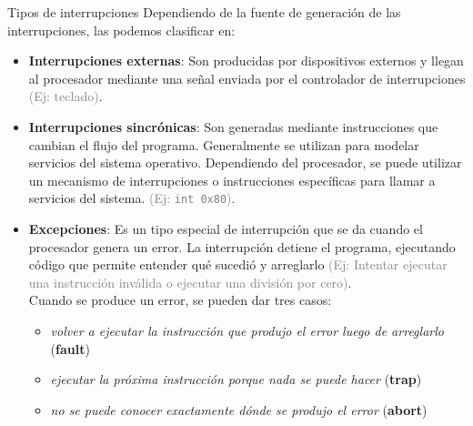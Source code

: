 \documentclass[aspectratio=169]{beamer}
\begin{document}
\begin{frame}[fragile]{Tipos de interrupciones}
    Dependiendo de la fuente de generación de las interrupciones, las podemos clasificar en:
    \bigskip
    \begin{itemize}
    \setlength\itemsep{0.5cm}
    \item<2-> \normalsize \textbf{Interrupciones externas}:
    \small Son producidas por dispositivos externos y llegan al procesador mediante una señal enviada por el controlador de interrupciones \textcolor{gray}{(Ej: teclado)}.
    \item<3-> \normalsize \textbf{Interrupciones sincrónicas}:
    \small Son generadas mediante instrucciones que cambian el flujo del programa. Generalmente se utilizan para modelar servicios del sistema operativo.
    Dependiendo del procesador, se puede utilizar un mecanismo de interrupciones o instrucciones específicas para llamar a servicios del sistema. \textcolor{gray}{(Ej: \texttt{int 0x80})}.
    \item<4-> \normalsize \textbf{Excepciones}:
    \small Es un tipo especial de interrupción que se da cuando el procesador genera un error. La interrupción detiene el programa, ejecutando código que permite entender qué sucedió y arreglarlo
    \textcolor{gray}{(Ej: Intentar ejecutar una instrucción inválida o ejecutar una división por cero)}.\\
    \footnotesize
    Cuando se produce un error, se pueden dar tres casos:\\
     \begin{itemize}
      \item \textit{volver a ejecutar la instrucción que produjo el error luego de arreglarlo} (\textbf{fault})
      \item \textit{ejecutar la próxima instrucción porque nada se puede hacer} (\textbf{trap})
      \item \textit{no se puede conocer exactamente dónde se produjo el error} (\textbf{abort})
     \end{itemize}
    \end{itemize}
\end{frame}
\end{document}
